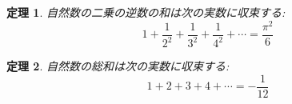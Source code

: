 \documentclass[dvipdfmx]{jsarticle}
\newtheorem{them}{定理}
\begin{document}
  \begin{them}
    自然数の二乗の逆数の和は次の実数に収束する:
    \[
      1 + \frac{1}{2^2} + \frac{1}{3^2} + \frac{1}{4^2} + \cdots = \frac{\pi^2}{6}
    \]
  \end{them}

  \begin{them}
    自然数の総和は次の実数に収束する:
    \[
      1 + 2 + 3 + 4 + \cdots = -\frac{1}{12}
    \]
  \end{them}
\end{document}
